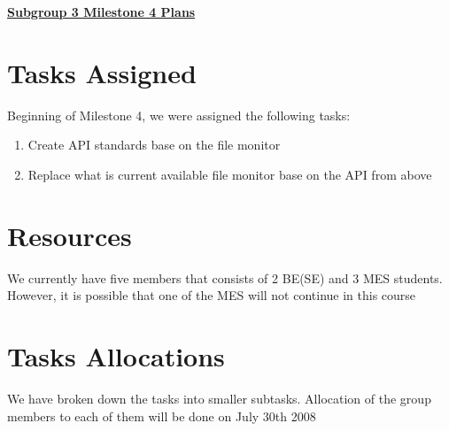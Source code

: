 \documentclass{article}
\begin{document}
{\large \textbf{\underline{Subgroup 3 Milestone 4 Plans}}}

\section{Tasks Assigned}

Beginning of Milestone 4, we were assigned the following tasks:

\begin{enumerate}
    \item Create API standards base on the file monitor

    \item Replace what is current available file monitor base on the API from above

\end{enumerate} 

\section{Resources}

We currently have five members that consists of 2 BE(SE) and 3 MES students. However, it is possible that one of the MES will not continue in this course

\section{Tasks Allocations}

We have broken down the tasks into smaller subtasks. Allocation of the group members to each of them will be done on July 30th 2008
\end{document}
